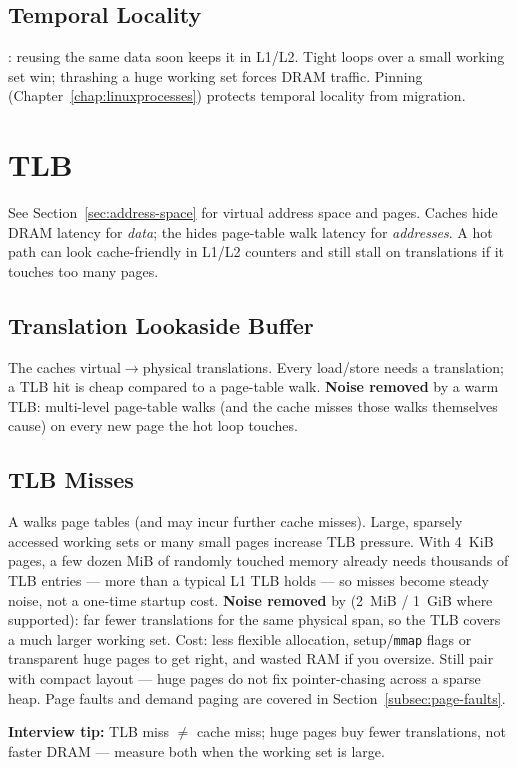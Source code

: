 \subsection{Temporal Locality}
\label{subsec:temporal-locality}
: reusing the same data soon keeps it in L1/L2. 
Tight loops over a small working set win; thrashing a huge working set 
forces DRAM traffic. Pinning (Chapter~\ref{chap:linuxprocesses}) protects 
temporal locality from migration.

\section{TLB}
\label{sec:tlb}
See Section~\ref{sec:address-space} for virtual address space and pages.
\newline
Caches hide DRAM latency for \emph{data}; the  hides page-table walk latency 
for \emph{addresses}. A hot path can look cache-friendly in L1/L2 counters and still stall 
on translations if it touches too many pages.

\subsection{Translation Lookaside Buffer}
\label{subsec:translation-lookaside-buffer}
The  caches virtual$\rightarrow$physical translations. 
Every load/store needs a translation; a TLB hit is cheap compared to a page-table walk.
\newline
\textbf{Noise removed} by a warm TLB: multi-level page-table walks (and the cache misses those 
walks themselves cause) on every new page the hot loop touches.

\subsection{TLB Misses}
\label{subsec:tlb-misses}
A  walks page tables (and may incur further cache misses). 
Large, sparsely accessed working sets or many small pages increase TLB pressure. 
With 4~KiB pages, a few dozen MiB of randomly touched memory already needs thousands of 
TLB entries --- more than a typical L1 TLB holds --- so misses become steady noise, not a 
one-time startup cost.
\newline
\textbf{Noise removed} by  (2~MiB / 1~GiB where supported): far fewer 
translations for the same physical span, so the TLB covers a much larger working set. 
Cost: less flexible allocation, setup/\texttt{mmap} flags or transparent huge pages to get right, 
and wasted RAM if you oversize. Still pair with compact layout --- huge pages do not fix 
pointer-chasing across a sparse heap. Page faults and demand paging are covered in 
Section~\ref{subsec:page-faults}.
\par\noindent\textbf{Interview tip:} TLB miss $\neq$ cache miss; huge pages buy fewer translations, 
not faster DRAM --- measure both when the working set is large.
